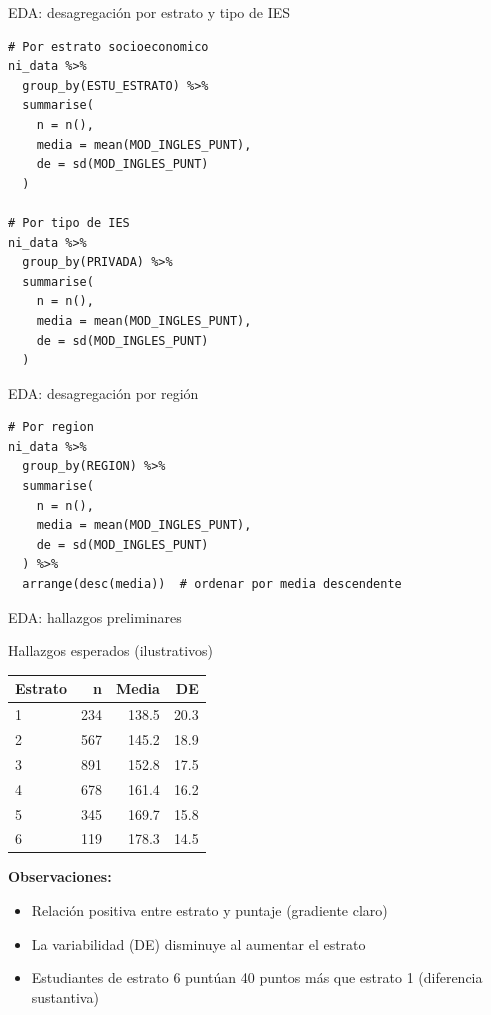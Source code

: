 \documentclass[aspectratio=169, 11pt]{beamer}
\begin{document}
\begin{frame}[fragile]{EDA: desagregación por estrato y tipo de IES}
\begin{lstlisting}
# Por estrato socioeconomico
ni_data %>%
  group_by(ESTU_ESTRATO) %>%
  summarise(
    n = n(),
    media = mean(MOD_INGLES_PUNT),
    de = sd(MOD_INGLES_PUNT)
  )

# Por tipo de IES
ni_data %>%
  group_by(PRIVADA) %>%
  summarise(
    n = n(),
    media = mean(MOD_INGLES_PUNT),
    de = sd(MOD_INGLES_PUNT)
  )
\end{lstlisting}
\end{frame}

\begin{frame}[fragile]{EDA: desagregación por región}
\begin{lstlisting}
# Por region
ni_data %>%
  group_by(REGION) %>%
  summarise(
    n = n(),
    media = mean(MOD_INGLES_PUNT),
    de = sd(MOD_INGLES_PUNT)
  ) %>%
  arrange(desc(media))  # ordenar por media descendente
\end{lstlisting}
\end{frame}

\begin{frame}{EDA: hallazgos preliminares}
\begin{exampleblock}{Hallazgos esperados (ilustrativos)}
\small
\renewcommand{\arraystretch}{1.1}
\begin{tabular}{lrrr}
\toprule
\textbf{Estrato} & \textbf{n} & \textbf{Media} & \textbf{DE} \\
\midrule
1 & 234 & 138.5 & 20.3 \\
2 & 567 & 145.2 & 18.9 \\
3 & 891 & 152.8 & 17.5 \\
4 & 678 & 161.4 & 16.2 \\
5 & 345 & 169.7 & 15.8 \\
6 & 119 & 178.3 & 14.5 \\
\bottomrule
\end{tabular}
\end{exampleblock}

\textbf{Observaciones:}
\begin{itemize}\setlength{\itemsep}{0pt}
\item Relaci\'on positiva entre estrato y puntaje (gradiente claro)
\item La variabilidad (DE) disminuye al aumentar el estrato
\item Estudiantes de estrato 6 punt\'uan 40 puntos m\'as que estrato 1 (diferencia sustantiva)
\end{itemize}
\end{frame}
\end{document}
